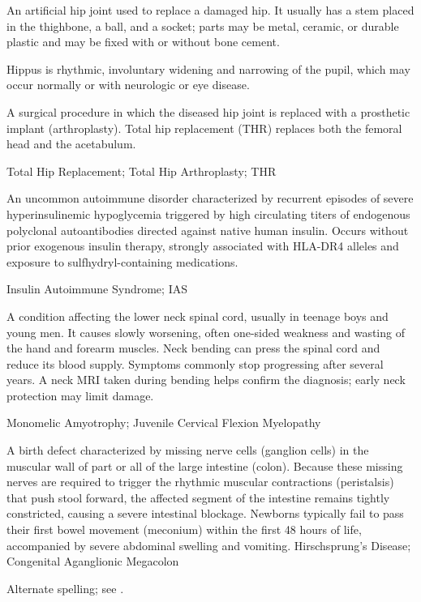  An artificial hip joint used to replace a damaged hip. It usually has a stem placed in the thighbone, a ball, and a socket; parts may be metal, ceramic, or durable plastic and may be fixed with or without bone cement.

 Hippus is rhythmic, involuntary widening and narrowing of the pupil, which may occur normally or with neurologic or eye disease.

 A surgical procedure in which the diseased hip joint is replaced with a prosthetic
implant (arthroplasty). Total hip replacement (THR) replaces both the femoral head and
the acetabulum.

\synonyms
Total Hip Replacement; Total Hip Arthroplasty; THR

 An uncommon autoimmune disorder characterized by recurrent episodes of severe hyperinsulinemic hypoglycemia triggered by high circulating titers of endogenous polyclonal autoantibodies directed against native human insulin. Occurs without prior exogenous insulin therapy, strongly associated with HLA-DR4 alleles and exposure to sulfhydryl-containing medications.

\synonyms
Insulin Autoimmune Syndrome; IAS

 A condition affecting the lower neck spinal cord, usually in teenage boys and young men. It causes slowly worsening, often one-sided weakness and wasting of the hand and forearm muscles. Neck bending can press the spinal cord and reduce its blood supply. Symptoms commonly stop progressing after several years. A neck MRI taken during bending helps confirm the diagnosis; early neck protection may limit damage.

\synonyms
Monomelic Amyotrophy; Juvenile Cervical Flexion Myelopathy

 A birth defect characterized by missing nerve cells (ganglion cells) in the muscular wall of part or all of the large intestine (colon). Because these missing nerves are required to trigger the rhythmic muscular contractions (peristalsis) that push stool forward, the affected segment of the intestine remains tightly constricted, causing a severe intestinal blockage. Newborns typically fail to pass their first bowel movement (meconium) within the first 48 hours of life, accompanied by severe abdominal swelling and vomiting.
\synonyms
Hirschsprung's Disease; Congenital Aganglionic Megacolon

 Alternate spelling; see .

